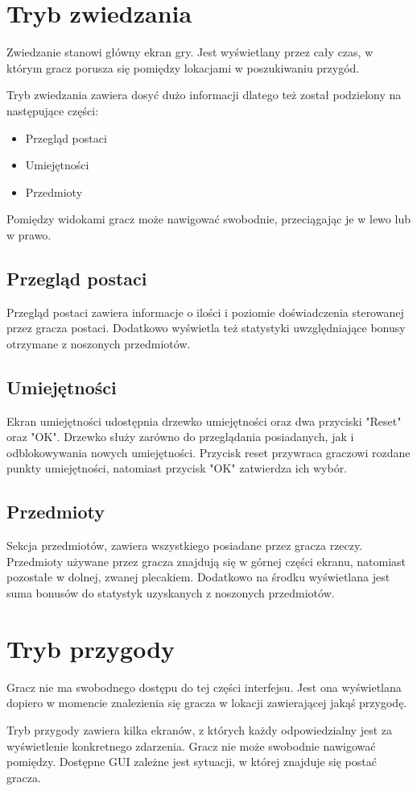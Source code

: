 \documentclass	{xmgr}
\begin{document}
\section{Tryb zwiedzania}
Zwiedzanie stanowi główny ekran gry. Jest wyświetlany przez cały czas, w którym gracz porusza się pomiędzy lokacjami w poszukiwaniu przygód. 

Tryb zwiedzania zawiera dosyć dużo informacji dlatego też został podzielony na następujące części: 
\begin{itemize}
	\item Przegląd postaci
	\item Umiejętności
	\item Przedmioty
\end{itemize}
Pomiędzy widokami gracz może nawigować swobodnie, przeciągając je w lewo lub w prawo.
\subsection*{Przegląd postaci}
Przegląd postaci zawiera informacje o ilości i poziomie doświadczenia sterowanej przez gracza postaci. Dodatkowo wyświetla też statystyki uwzględniające bonusy otrzymane z noszonych przedmiotów.
\subsection*{Umiejętności}
Ekran umiejętności udostępnia drzewko umiejętności oraz dwa przyciski "Reset" oraz "OK". Drzewko służy zarówno do przeglądania posiadanych, jak i odblokowywania nowych umiejętności. Przycisk reset przywraca graczowi rozdane punkty umiejętności, natomiast przycisk "OK" zatwierdza ich wybór.
\subsection*{Przedmioty}
Sekcja przedmiotów, zawiera wszystkiego posiadane przez gracza rzeczy. Przedmioty używane przez gracza znajdują się w górnej części ekranu, natomiast pozostałe w dolnej, zwanej plecakiem. Dodatkowo na środku wyświetlana jest suma bonusów do statystyk uzyskanych z noszonych przedmiotów.
\section{Tryb przygody}
Gracz nie ma swobodnego dostępu do tej części interfejsu. Jest ona wyświetlana dopiero w momencie znalezienia się gracza w lokacji zawierającej jakąś przygodę.

Tryb przygody zawiera kilka ekranów, z których każdy odpowiedzialny jest za wyświetlenie konkretnego zdarzenia. Gracz nie może swobodnie nawigować pomiędzy. Dostępne GUI zależne jest sytuacji, w której znajduje się postać gracza.
\end{document}
